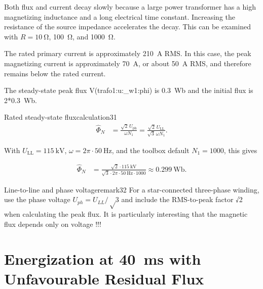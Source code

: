 Both flux and current decay slowly because a large power transformer has a high
magnetizing inductance and a long electrical time constant. Increasing the
resistance of the source impedance accelerates the decay. This can be examined
with $R=\SI{10}{\ohm}$, \SI{100}{\ohm}, and \SI{1000}{\ohm}.

The rated primary current is approximately \SI{210}{\ampere} RMS. In this
case, the peak magnetizing current is approximately \SI{70}{\ampere}, or about
\SI{50}{\ampere} RMS, and therefore remains below the rated current.

The steady-state peak flux V(trafo1:u:\_w1:phi) is \SI{0.3}{\weber} and the initial flux is 2*\SI{0.3}{\weber}.


\begin{calculation}{Rated steady-state flux}{calculation31} %
\begin{align}
\widehat{\Phi}_N
  &=\frac{\sqrt{2}\,U_{\mathrm{ph}}}{\omega N_1}
   =\frac{\sqrt{2}\,U_{\mathrm{LL}}}
          {\sqrt{3}\,\omega N_1}.
\end{align}

With $U_{\mathrm{LL}}=\SI{115}{\kilo\volt}$,
$\omega=2\pi\cdot\SI{50}{\hertz}$, and the toolbox default
$N_1=1000$, this gives

\begin{align}
\widehat{\Phi}_N
  &=\frac{\sqrt{2}\cdot\SI{115}{\kilo\volt}}
          {\sqrt{3}\cdot 2\pi\cdot\SI{50}{\hertz}\cdot1000}
    \approx\boxed{\SI{0.299}{\weber}}.
\end{align}
\end{calculation}

\begin{remark}{Line-to-line and phase voltage}{remark32}
For a star-connected three-phase winding, use the phase voltage $U_{ph} = U_{LL}/√3$ and include the RMS-to-peak factor √2 when calculating the peak flux. It is particularly interesting that the magnetic flux depends only on voltage !!! 
\end{remark}

\section{Energization at \SI{40}{\milli\second} with Unfavourable Residual Flux}
\label{sec:section34}

